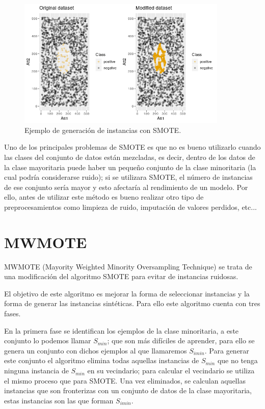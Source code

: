 \begin{figure}[h]
	\centering
	\includegraphics[width=100mm]{imagenes/SMOTE_comparison.png}
	\caption{Ejemplo de generación de instancias con SMOTE.}
	\label{fig:41}
\end{figure}
\verticalspace

Uno de los principales problemas de SMOTE es que no es bueno utilizarlo cuando las clases del conjunto de datos están mezcladas, es decir, dentro de los datos de la clase mayoritaria puede haber un pequeño conjunto de la clase minoritaria (la cual podría considerarse ruido); si se utilizara SMOTE, el número de instancias de ese conjunto sería mayor y esto afectaría al rendimiento de un modelo. Por ello, antes de utilizar este método es bueno realizar otro tipo de preprocesamientos como limpieza de ruido, imputación de valores perdidos, etc...
\newpage
\section{MWMOTE}
MWMOTE (Mayority Weighted Minority Oversampling Technique) \cite{barua2012mwmote} se trata de una modificación del algoritmo SMOTE para evitar de instancias ruidosas.\newline

El objetivo de este algoritmo es mejorar la forma de seleccionar instancias y la forma de generar las instancias sintéticas. Para ello este algoritmo cuenta con tres fases.\newline

En la primera fase se identifican los ejemplos de la clase minoritaria, a este conjunto lo podemos llamar $S_{min}$; que son más difíciles de aprender, para ello se genera un conjunto con dichos ejemplos al que llamaremos $S_{imin}$. Para generar este conjunto el algoritmo elimina todas aquellas instancias de $S_{min}$ que no tenga ninguna instancia de $S_{min}$ en su vecindario; para calcular el vecindario se utiliza el mismo proceso que para SMOTE. Una vez eliminados, se calculan aquellas instancias que son fronterizas con un conjunto de datos de la clase mayoritaria, estas instancias son las que forman $S_{imin}$.\newline


